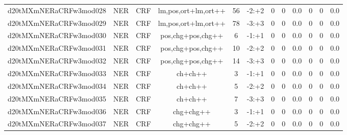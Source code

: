 \documentclass[a4paper]{article}
\begin{document}
\begin{landscape}
\begin{center}
\begin{tabular}{ |c|c|c|c|c|c|c|c|c|c|c|c|}
 
 	
 	\small{ d20tMXmNERaCRFw3mod028 } & \small{ NER} & \small{  CRF }  & lm,pos,ort+lm,ort++  &  56 &  \small{  -2:+2 }  &  0 & 0 & 0.0  &  0 & 0 & 0.0 \\
 	

 
 	
 	\small{ d20tMXmNERaCRFw3mod029 } & \small{ NER} & \small{  CRF }  & lm,pos,ort+lm,ort++  &  78 &  \small{  -3:+3 }  &  0 & 0 & 0.0  &  0 & 0 & 0.0 \\
 	

 
 	
 	\small{ d20tMXmNERaCRFw3mod030 } & \small{ NER} & \small{  CRF }  & pos,chg+pos,chg++  &  6 &  \small{  -1:+1 }  &  0 & 0 & 0.0  &  0 & 0 & 0.0 \\
 	

 
 	
 	\small{ d20tMXmNERaCRFw3mod031 } & \small{ NER} & \small{  CRF }  & pos,chg+pos,chg++  &  10 &  \small{  -2:+2 }  &  0 & 0 & 0.0  &  0 & 0 & 0.0 \\
 	

 
 	
 	\small{ d20tMXmNERaCRFw3mod032 } & \small{ NER} & \small{  CRF }  & pos,chg+pos,chg++  &  14 &  \small{  -3:+3 }  &  0 & 0 & 0.0  &  0 & 0 & 0.0 \\
 	

 
 	
 	\small{ d20tMXmNERaCRFw3mod033 } & \small{ NER} & \small{  CRF }  & ch+ch++  &  3 &  \small{  -1:+1 }  &  0 & 0 & 0.0  &  0 & 0 & 0.0 \\
 	

 
 	
 	\small{ d20tMXmNERaCRFw3mod034 } & \small{ NER} & \small{  CRF }  & ch+ch++  &  5 &  \small{  -2:+2 }  &  0 & 0 & 0.0  &  0 & 0 & 0.0 \\
 	

 
 	
 	\small{ d20tMXmNERaCRFw3mod035 } & \small{ NER} & \small{  CRF }  & ch+ch++  &  7 &  \small{  -3:+3 }  &  0 & 0 & 0.0  &  0 & 0 & 0.0 \\
 	

 
 	
 	\small{ d20tMXmNERaCRFw3mod036 } & \small{ NER} & \small{  CRF }  & chg+chg++  &  3 &  \small{  -1:+1 }  &  0 & 0 & 0.0  &  0 & 0 & 0.0 \\
 	

 
 	
 	\small{ d20tMXmNERaCRFw3mod037 } & \small{ NER} & \small{  CRF }  & chg+chg++  &  5 &  \small{  -2:+2 }  &  0 & 0 & 0.0  &  0 & 0 & 0.0 \\
 	


\end{tabular}
\end{center}
\end{landscape}
\end{document}

